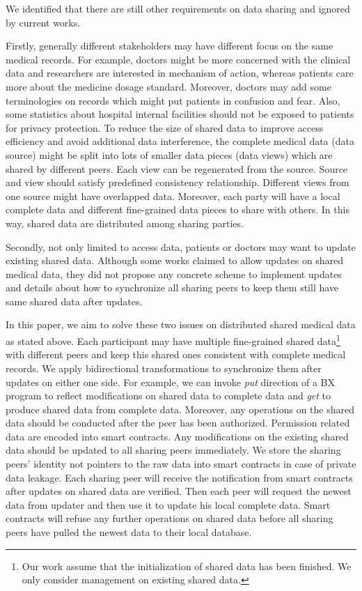 \documentclass[conference]{IEEEtran}
\begin{document}
We identified that there are still other requirements on data sharing and ignored by current works. 

Firstly, generally different stakeholders may have different focus on the same medical records. For example, doctors might be more concerned with the clinical data and researchers are interested in mechanism of action, whereas patients care more about the medicine dosage standard. Moreover, doctors may add some terminologies on records which might put patients in confusion and fear. Also, some statistics about hospital internal facilities should not be exposed to patients for privacy protection.  To reduce the size of shared data to improve access efficiency and avoid additional data interference, the complete medical data (data source) might be split into lots of smaller data pieces (data views) which are shared by different peers. Each view can be regenerated from the source. Source and view should satisfy predefined consistency relationship. Different views from one source might have overlapped data. Moreover, each party will have a local complete data and different fine-grained data pieces to share with others. In this way, shared data are distributed among sharing parties.

Secondly, not only limited to access data, patients or doctors may want to update existing shared data. Although some works \cite{azaria2016medrec} claimed to allow updates on shared medical data, they did not propose any concrete scheme to implement updates and details about how to synchronize all sharing peers to keep them still have same shared data after updates.

In this paper, we aim to solve these two issues on distributed shared medical data as stated above. 
Each participant may have multiple fine-grained shared data\footnote{Our work assume that the initialization of shared data has been finished. We only consider management on existing shared data.} with different peers and keep this shared ones consistent with complete medical records. We apply bidirectional transformations \cite{hu2014validity} to synchronize them after updates on either one side. For example, we can invoke \emph{put} direction of a  BX program to reflect modifications on shared data to complete data and \emph{get} to produce shared data from complete data. 
Moreover,  any operations on the shared data should be conducted after the peer has been authorized. Permission related data are encoded into smart contracts. Any modifications on the existing shared data should be updated to all sharing peers immediately. We store the sharing peers' identity not pointers to the raw data into smart contracts in case of private data leakage. Each sharing peer will receive the notification from smart contracts after updates on shared data are verified. Then each peer will request the newest data from updater and then use it to update his local complete data. Smart contracts will refuse any further operations on shared data before all sharing peers have pulled the newest data to their local database.
\end{document}
